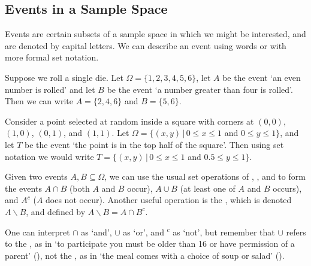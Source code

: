 \subsection*{Events in a Sample Space}
\begin{definition}
Events are certain subsets of a sample space in which we might be interested, and are denoted by capital letters. We can describe an event using words or with more formal set notation.
\end{definition}
\begin{examp}
Suppose we roll a single die. Let $\Omega = \{1,2,3,4,5,6\}$, let $A$ be the event `an even number is rolled' and let $B$ be the event `a number greater than four is rolled'. Then we can write $A = \{2,4,6\}$ and $B = \{5,6\}$.
\end{examp}
\begin{examp}\label{unitsquare}
Consider a point selected at random inside a square with corners at $(0,0)$, $(1,0)$, $(0,1)$, and $(1,1)$. Let $\Omega = \{(x,y) \, | \, 0 \leq x \leq 1$ and $0 \leq y \leq 1\}$, and let $T$ be the event `the point is in the top half of the square'. Then using set notation we would write $T = \{(x,y) \, | \, 0 \leq x \leq 1$ and $0.5 \leq y \leq 1\}$.
\end{examp}
\par
Given two events $A, B \subseteq \Omega$, we can use the usual set operations of , , and  to form the events $A \cap B$ (both $A$ and $B$ occur), $A \cup B$ (at least one of $A$ and $B$ occurs), and $A^{c}$ ($A$ does not occur). Another useful operation is the , which is denoted $A \backslash B$, and defined by $A \backslash B = A \cap B^{c}$.
\par
One can interpret $\cap$ as `and', $\cup$ as `or', and $^{c}$ as `not', but remember that $\cup$ refers to the , as in `to participate you must be older than 16 or have permission of a parent' (), not the , as in `the meal comes with a choice of soup or salad' ().
\par
